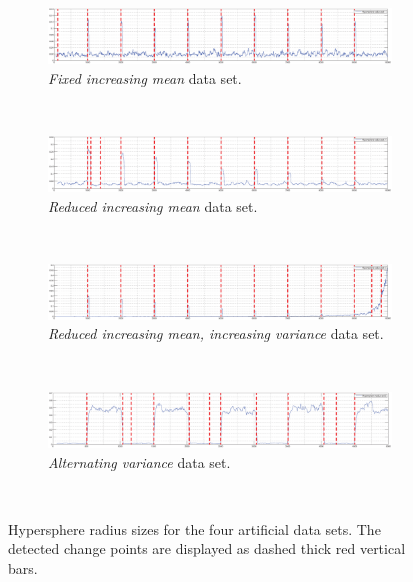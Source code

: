 \begin{figure}
  \centering
  \begin{subfigure}[b]{1\textwidth}
    \includegraphics[width=1\textwidth]{./Figures/chapter5/set_1_results.eps}
    \caption[Fixed increasing mean, thresholds]{\emph{Fixed increasing mean} data set.}
      \label{fig:camci_fixed_increasing_mean_thresholds}
  \end{subfigure} \\

  \begin{subfigure}[b]{1\textwidth}
   \includegraphics[width=1\textwidth]{./Figures/chapter5/set_2_results.eps}
    \caption[Reduced increasing mean, thresholds]{\emph{Reduced increasing mean} data set.}
    \label{fig:takeuchi_reduced_increasing_mean_thresholds}
  \end{subfigure} \\

  \begin{subfigure}[b]{1\textwidth}
    \includegraphics[width=1\textwidth]{./Figures/chapter5/set_3_results.eps}
      \caption[Reduced increasing mean, increasing variance, thresholds]{\emph{Reduced increasing mean, increasing variance} data set.}
      \label{fig:camci_reduced_increasing_mean_increasing_variance_thresholds}
  \end{subfigure} \\

  \begin{subfigure}[b]{1\textwidth}
   \includegraphics[width=1\textwidth]{./Figures/chapter5/set_4_results.eps}
    \caption[Alternating variance, thresholds]{\emph{Alternating variance} data set.}
    \label{fig:camci_takeuchi_alternating_variance_thresholds}
  \end{subfigure} \\

  \caption[Artificial data set results]{Hypersphere radius sizes for the four artificial data sets. The detected change points are displayed as dashed thick red vertical bars.}
  \label{fig:plots_results_artificial_data_sets}
\end{figure}